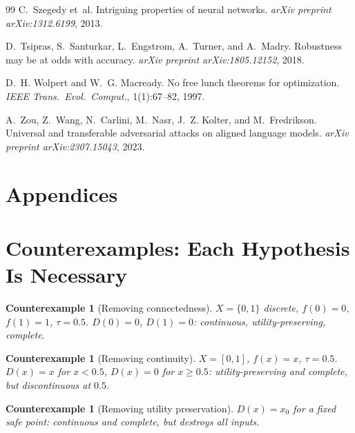 \documentclass[11pt]{article}
\newtheorem{counterexample}[theorem]{Counterexample}
\begin{document}
\begin{thebibliography}{99}
C.~Szegedy et~al.
\newblock Intriguing properties of neural networks.
\newblock \emph{arXiv preprint arXiv:1312.6199}, 2013.

D.~Tsipras, S.~Santurkar, L.~Engstrom, A.~Turner, and A.~Madry.
\newblock Robustness may be at odds with accuracy.
\newblock \emph{arXiv preprint arXiv:1805.12152}, 2018.

D.~H. Wolpert and W.~G. Macready.
\newblock No free lunch theorems for optimization.
\newblock \emph{IEEE Trans.\ Evol.\ Comput.}, 1(1):67--82, 1997.

A.~Zou, Z.~Wang, N.~Carlini, M.~Nasr, J.~Z. Kolter, and
M.~Fredrikson.
\newblock Universal and transferable adversarial attacks on aligned
  language models.
\newblock \emph{arXiv preprint arXiv:2307.15043}, 2023.
\end{thebibliography}


\newpage
\appendix

\section*{Appendices}

\section{Counterexamples: Each Hypothesis Is Necessary}
\label{app:counterexamples}

\begin{counterexample}[Removing connectedness]
$X = \{0,1\}$ discrete, $f(0)=0$, $f(1)=1$, $\tau=0.5$.
$D(0)=0$, $D(1)=0$: continuous, utility-preserving, complete.
\end{counterexample}

\begin{counterexample}[Removing continuity]
$X=[0,1]$, $f(x)=x$, $\tau=0.5$. $D(x)=x$ for $x<0.5$,
$D(x)=0$ for $x \geq 0.5$: utility-preserving and complete,
but discontinuous at $0.5$.
\end{counterexample}

\begin{counterexample}[Removing utility preservation]
$D(x) = x_0$ for a fixed safe point: continuous and complete,
but destroys all inputs.
\end{counterexample}
\end{document}
